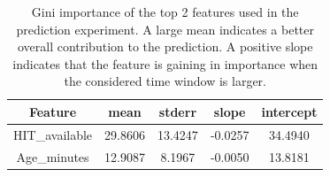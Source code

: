 \begin{table}[t!]
\begin{center}
\scriptsize
\caption {Gini importance of the top 2 features used in the prediction experiment. A large mean indicates a better overall contribution to the prediction. A positive slope indicates that the feature is gaining in importance when the considered time window is larger.}
\begin{tabular}{|c|c|c|c|c|}
\hline
Feature              & mean      & stderr    & slope     & intercept \\
\hline
HIT\_available      & 29.8606 & 13.4247 & -0.0257 & 34.4940 \\
Age\_minutes           & 12.9087 &  8.1967 & -0.0050 & 13.8181 \\

\end{tabular}
\end{center}
\end{table}
